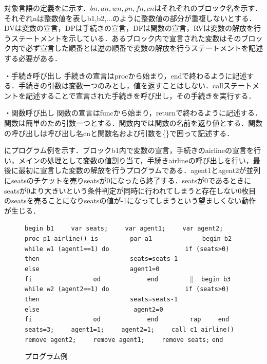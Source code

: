 \documentclass[submit,PRO]{ipsj}
\def\|{\verb|}
\begin{document}
対象言語の定義をに示す．$bn,an,wn,pn,fn,cn$はそれぞれのブロック名を示す．それぞれnは整数値を表しb1,b2,...のように整数値の部分が重複しないとする．DVは変数の宣言，DPは手続きの宣言，DFは関数の宣言，RVは変数の解放を行うステートメントを示している．あるブロック内で宣言された変数はそのブロック内で必ず宣言した順番とは逆の順番で変数の解放を行うステートメントを記述する必要がある．

・手続き呼び出し  手続きの宣言はprocから始まり，endで終わるように記述する．手続きの引数は変数一つのみとし，値を返すことはしない．callステートメントを記述することで宣言された手続きを呼び出し，その手続きを実行する．

・関数呼び出し  関数の宣言はfuncから始まり，returnで終わるように記述する．関数は簡単のため引数一つとする．関数内では関数の名前を返り値とする．関数の呼び出しは呼び出し名cnと関数名および引数を\{\}で囲って記述する．

にプログラム例を示す．ブロックb1内で変数の宣言，手続きのairlineの宣言を行い，メインの処理として変数の値割り当て，手続きairlineの呼び出しを行い，最後に最初に宣言した変数の解放を行うプログラムである．agent1とagent2が並列にseatsのチケットを売りseatsが0になったら終了する．seatsが0であるときにseatsが0より大きいという条件判定が同時に行われてしまうと存在しない0枚目のseatsを売ることになりseatsの値が-1になってしまうという望ましくない動作が生じる．


\begin{figure}[tb]
\vbox{
\hbox{\|begin b1|}
\hbox{\|    var seats;|}
\hbox{\|    var agent1;|}
\hbox{\|    var agent2;|}
\hbox{\|    proc p1 airline() is|}
\hbox{\|        par a1 |}
\hbox{\|            begin b2|}
\hbox{\|                while w1 (agent1==1) do|}
\hbox{\|                    if (seats>0) then|}
\hbox{\|                        seats=seats-1|}
\hbox{\|                    else|}
\hbox{\|                        agent1=0|}
\hbox{\|                    fi|}
\hbox{\|                od|}
\hbox{\|            end|}
\hbox{\|        |$||$\|  begin b3|}
\hbox{\|                while w2 (agent2==1) do|}
\hbox{\|                    if (seats>0) then|}
\hbox{\|                        seats=seats-1|}
\hbox{\|                    else |}
\hbox{\|                        agent2=0|}
\hbox{\|                    fi|}
\hbox{\|                od|}
\hbox{\|            end|}
\hbox{\|        rap|}
\hbox{\|    end|}
\hbox{\|    seats=3;|}
\hbox{\|    agent1=1;|}
\hbox{\|    agent2=1;|}
\hbox{\|    call c1 airline()|}
\hbox{\|    remove agent2;|}
\hbox{\|    remove agent1;|}
\hbox{\|    remove seats;|}
\hbox{\|end|}
}
\centerline{}
\caption{プログラム例}
\label{fig:sample}
\end{figure}
\end{document}
